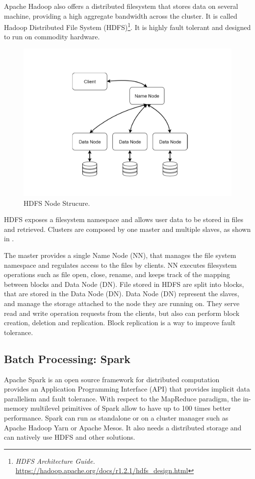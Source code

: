 Apache Hadoop also offers a distributed filesystem that stores data on several machine, providing a high aggregate bandwidth across the cluster. It is called Hadoop Distributed File System (HDFS)\footnote{\textit{HDFS Architecture Guide.} \url{https://hadoop.apache.org/docs/r1.2.1/hdfs\_design.html}}. 
It is highly fault tolerant and designed to run on commodity hardware.
\begin{figure}
	\vspace{-1.5cm}
	\centering
	\includegraphics[width=\columnwidth]{Images/hdfs_1.pdf}  
	\vspace{-1cm}
	\caption[HDFS Node Strucure]{HDFS Node Strucure.}
	\label{fig:hdfsNodeStruct}
\end{figure}
HDFS exposes a filesystem namespace and allows user data to be stored in files and retrieved. Clusters are composed by one master and multiple slaves, as shown in .

The master provides a single Name Node (NN), that manages
the file system namespace and regulates access to the files by clients.
NN executes filesystem operations such as file open, close, rename, 
and keeps track of the mapping between blocks and Data Node (DN). 
File stored in HDFS are split into blocks, that are stored in the Data Node (DN). Data Node (DN) represent the slaves, and manage the storage attached to the node they are running on. They serve read and write operation requests from the clients, but also can perform block creation, deletion and replication. Block replication is a way to improve fault tolerance.

\subsection{Batch Processing: Spark}\label{sec:spark}
Apache Spark is an open source framework for distributed computation 
~\cite{misc:ApacheSpark} provides an Application Programming Interface (API) that provides implicit data parallelism and fault tolerance. With respect to the MapReduce paradigm, the in-memory multilevel primitives of Spark allow to have up to 100 times better performance. Spark can run as standalone or on a cluster manager such as Apache Hadoop Yarn or Apache Mesos. It also needs a distributed storage and can natively use HDFS and other solutions. 

